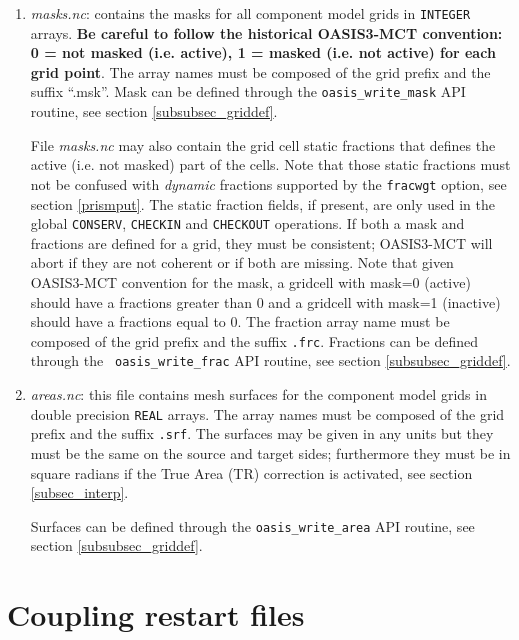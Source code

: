 \begin{enumerate}
  Longitudes and latitudes of grid points or corners can be defined through the {\tt oasis\_write\_grid} or {\tt oasis\_write\_corner} API routines respectively,  see section \ref{subsubsec_griddef}.
 
\item {\em masks.nc}: contains the masks for all component model grids
  in {\tt INTEGER} arrays.
{\bf Be careful to follow the historical
    OASIS3-MCT convention: 0 = not masked (i.e. active), 1 = masked
    (i.e. not active) for each grid point}. The array names must be
  composed of the grid prefix and the suffix ``.msk''. Mask can be defined through the {\tt oasis\_write\_mask} API routine, see section \ref{subsubsec_griddef}.
  
 File {\em masks.nc} may also contain the grid cell static fractions that
 defines the active (i.e. not masked) part of the cells. Note that those static fractions
must not be confused with {\it dynamic} fractions supported by the {\tt fracwgt} option, see section \ref{prismput}.  
The static fraction fields, if present, are only
 used in the global {\tt CONSERV}, {\tt CHECKIN} and {\tt CHECKOUT} operations. If both a
 mask and fractions are defined for a grid, they must be consistent;
 OASIS3-MCT will abort if they are not coherent or if both are
 missing.  Note that given OASIS3-MCT convention for the mask, a gridcell
 with mask=0 (active) should have a fractions greater than 0 and a
 gridcell with mask=1 (inactive) should have a fractions equal to 0.
 The fraction array name must be composed of the grid prefix and the
 suffix {\tt .frc}. Fractions can be defined through the {\tt
   oasis\_write\_frac} API routine, see section
 \ref{subsubsec_griddef}.
 
  
\item {\em areas.nc}: this file contains mesh surfaces for the
  component model grids in double precision {\tt REAL} arrays. The
  array names must be composed of the grid prefix and the suffix
  {\tt .srf}.  The surfaces may be given in any units but they must be
  the same on the source and target sides; furthermore they must be in square radians if the True Area (TR) correction is activated, see section \ref{subsec_interp}.

  Surfaces can be defined through the {\tt oasis\_write\_area} API routine, see section \ref{subsubsec_griddef}.
  
\end{enumerate}

\section{Coupling restart files}
\label{subsec_restartdata}

